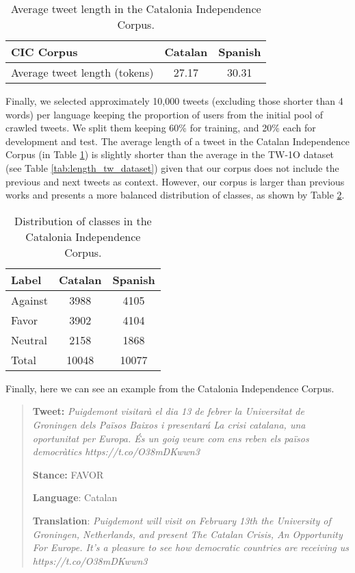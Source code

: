 \documentclass[10pt, a4paper]{article}
\begin{document}
\begin{table}[!ht]
\centering
\begin{tabular}{lcc} \hline
CIC Corpus & Catalan & Spanish \\ \hline
Average tweet length (tokens)& 27.17 & 30.31 \\ \hline
\end{tabular}
\caption{Average tweet length in the Catalonia Independence Corpus.}\label{tab:length_ind_dataset}
\end{table}

Finally, we selected approximately 10,000 tweets (excluding those shorter than 4 words) per language keeping the proportion of users from the initial pool of crawled tweets. We split them keeping 60\% for training, and 20\% each for development and test. The average length of a tweet in the Catalan Independence Corpus (in Table \ref{tab:length_ind_dataset}) is slightly shorter than the average in the TW-1O dataset (see Table \ref{tab:length_tw_dataset}) given that our corpus does not include the previous and next tweets as context. However, our corpus is larger than previous works \cite{mohammad-etal-2016-semeval,taule18} and presents a more balanced distribution of classes, as shown by Table \ref{tab:distr_dataset}.

\begin{table}[!ht]
\centering
\begin{tabular}{lcc}\hline
Label & Catalan & Spanish \\ \hline
Against & 3988 & 4105 \\
Favor & 3902 & 4104 \\
Neutral & 2158 & 1868 \\ \hline
Total & 10048 & 10077 \\ \hline
\end{tabular}
\caption{Distribution of classes in the Catalonia Independence Corpus.}\label{tab:distr_dataset}
\end{table}

Finally, here we can see an example from the Catalonia Independence Corpus.

\begin{quote}
\textbf{Tweet:} \textit{Puigdemont visitar\`a el dia 13 de febrer la Universitat de Groningen dels Pa\"isos Baixos i presentar\'a  La crisi catalana, una oportunitat per Europa. \'Es un goig veure com ens reben els pa\"isos democr\`atics https://t.co/O38mDKwwn3}

\textbf{Stance:} FAVOR

\textbf{Language}: Catalan

\textbf{Translation}: \textit{Puigdemont will visit
on February 13th the University of Groningen, Netherlands, and present The Catalan Crisis, An Opportunity For Europe.
It's a pleasure to see how democratic countries are receiving us https://t.co/O38mDKwwn3}
\end{quote}
\end{document}
